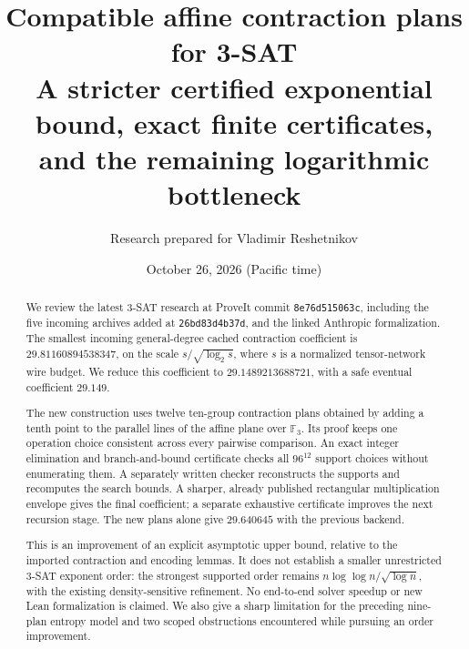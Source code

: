 \documentclass[11pt,letterpaper]{article}
\title{\color{navy}\bfseries Compatible affine contraction plans for 3-SAT\\[5pt]
\large A stricter certified exponential bound, exact finite certificates,\\
and the remaining logarithmic bottleneck}
\author{Research prepared for Vladimir Reshetnikov}
\date{October 26, 2026 (Pacific time)}
\numberwithin{equation}{section}
\theoremstyle{definition}\newtheorem{definition}[theorem]{Definition}
\theoremstyle{remark}\newtheorem{remark}[theorem]{Remark}
\newcommand{\F}{\mathbb F}
\newcommand{\NewC}{29.1489213688721}
\newcommand{\OldC}{29.81160894538347}
\begin{document}
\maketitle
\begin{abstract}
We review the latest 3-SAT research at ProveIt commit
\texttt{8e76d515063c}, including the five incoming archives added at
\texttt{26bd83d4b37d}, and the linked Anthropic formalization.
The smallest incoming general-degree cached contraction coefficient is
\(\OldC\), on the scale \(s/\sqrt{\log_2 s}\), where \(s\) is a normalized
tensor-network wire budget. We reduce this coefficient to
\(\NewC\), with a safe eventual coefficient \(29.149\).

The new construction uses twelve ten-group contraction plans obtained by
adding a tenth point to the parallel lines of the affine plane over
\(\F_3\). Its proof keeps one operation choice consistent across every
pairwise comparison. An exact integer elimination and branch-and-bound
certificate checks all \(96^{12}\) support choices without enumerating them.
A separately written checker reconstructs the supports and recomputes the
search bounds. A sharper, already published rectangular multiplication
envelope gives the final coefficient; a separate exhaustive certificate
improves the next recursion stage. The new plans alone give \(29.640645\)
with the previous backend.

This is an improvement of an explicit asymptotic upper bound, relative to
the imported contraction and encoding lemmas. It does not establish a
smaller unrestricted 3-SAT exponent order: the strongest supported order
remains \(n\log\log n/\sqrt{\log n}\), with the existing density-sensitive
refinement. No end-to-end solver speedup or new Lean formalization is
claimed. We also give a sharp limitation for the preceding nine-plan
entropy model and two scoped obstructions encountered while pursuing an
order improvement.
\end{abstract}
\tableofcontents
\clearpage






\end{document}

